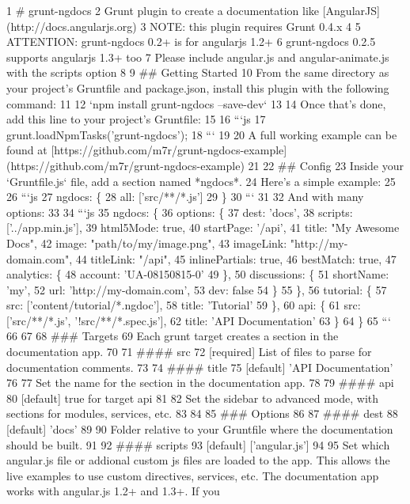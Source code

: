 \begin{DoxyCodeInclude}
1 # grunt-ngdocs
2 Grunt plugin to create a documentation like [AngularJS](http://docs.angularjs.org)
3 NOTE: this plugin requires Grunt 0.4.x
4 
5 ATTENTION: grunt-ngdocs 0.2+ is for angularjs 1.2+
6 grunt-ngdocs 0.2.5 supports angularjs 1.3+ too
7 Please include angular.js and angular-animate.js with the scripts option
8 
9 ## Getting Started
10 From the same directory as your project's Gruntfile and package.json, install this plugin with the
       following command:
11 
12 `npm install grunt-ngdocs --save-dev`
13 
14 Once that's done, add this line to your project's Gruntfile:
15 
16 ```js
17 grunt.loadNpmTasks('grunt-ngdocs');
18 ```
19 
20 A full working example can be found at
       [https://github.com/m7r/grunt-ngdocs-example](https://github.com/m7r/grunt-ngdocs-example)
21 
22 ## Config
23 Inside your `Gruntfile.js` file, add a section named *ngdocs*.
24 Here's a simple example:
25 
26 ```js
27 ngdocs: \{
28   all: ['src/**/*.js']
29 \}
30 ```
31 
32 And with many options:
33 
34 ```js
35 ngdocs: \{
36   options: \{
37     dest: 'docs',
38     scripts: ['../app.min.js'],
39     html5Mode: true,
40     startPage: '/api',
41     title: "My Awesome Docs",
42     image: "path/to/my/image.png",
43     imageLink: "http://my-domain.com",
44     titleLink: "/api",
45     inlinePartials: true,
46     bestMatch: true,
47     analytics: \{
48           account: 'UA-08150815-0'
49     \},
50     discussions: \{
51           shortName: 'my',
52           url: 'http://my-domain.com',
53           dev: false
54     \}
55   \},
56   tutorial: \{
57     src: ['content/tutorial/*.ngdoc'],
58     title: 'Tutorial'
59   \},
60   api: \{
61     src: ['src/**/*.js', '!src/**/*.spec.js'],
62     title: 'API Documentation'
63   \}
64 \}
65 ```
66 
67 
68 ### Targets
69 Each grunt target creates a section in the documentation app.
70 
71 #### src
72 [required] List of files to parse for documentation comments.
73 
74 #### title
75 [default] 'API Documentation'
76 
77 Set the name for the section in the documentation app.
78 
79 #### api
80 [default] true for target api
81 
82 Set the sidebar to advanced mode, with sections for modules, services, etc.
83 
84 
85 ### Options
86 
87 #### dest
88 [default] 'docs'
89 
90 Folder relative to your Gruntfile where the documentation should be built.
91 
92 #### scripts
93 [default] ['angular.js']
94 
95 Set which angular.js file or addional custom js files are loaded to the app. This allows the live examples
       to use custom directives, services, etc. The documentation app works with angular.js 1.2+ and 1.3+. If you

\end{DoxyCodeInclude}
